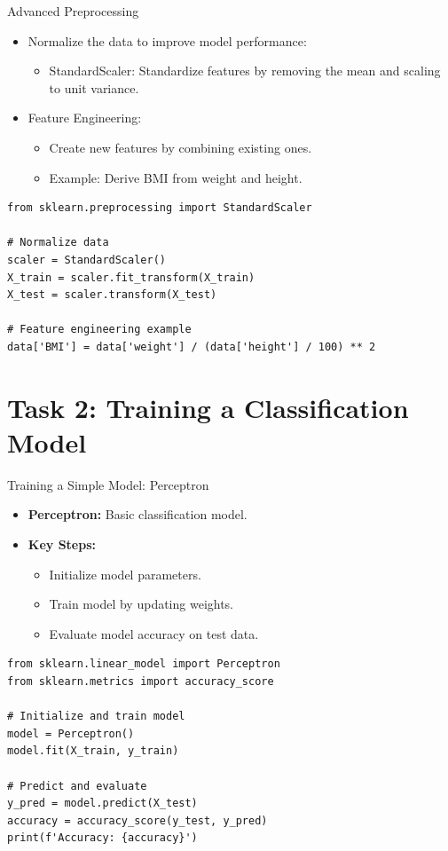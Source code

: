 \documentclass{beamer}
\begin{document}
\begin{frame}[fragile]{Advanced Preprocessing}
\begin{itemize}
    \item Normalize the data to improve model performance:
    \begin{itemize}
        \item StandardScaler: Standardize features by removing the mean and scaling to unit variance.
    \end{itemize}
    \item Feature Engineering:
    \begin{itemize}
        \item Create new features by combining existing ones.
        \item Example: Derive BMI from weight and height.
    \end{itemize}
\end{itemize}
\begin{lstlisting}
from sklearn.preprocessing import StandardScaler

# Normalize data
scaler = StandardScaler()
X_train = scaler.fit_transform(X_train)
X_test = scaler.transform(X_test)

# Feature engineering example
data['BMI'] = data['weight'] / (data['height'] / 100) ** 2
\end{lstlisting}
\end{frame}

\section{Task 2: Training a Classification Model}

\begin{frame}[fragile]{Training a Simple Model: Perceptron}
\begin{itemize}
    \item \textbf{Perceptron:} Basic classification model.
    \item \textbf{Key Steps:}
    \begin{itemize}
        \item Initialize model parameters.
        \item Train model by updating weights.
        \item Evaluate model accuracy on test data.
    \end{itemize}
\end{itemize}
\begin{lstlisting}
from sklearn.linear_model import Perceptron
from sklearn.metrics import accuracy_score

# Initialize and train model
model = Perceptron()
model.fit(X_train, y_train)

# Predict and evaluate
y_pred = model.predict(X_test)
accuracy = accuracy_score(y_test, y_pred)
print(f'Accuracy: {accuracy}')
\end{lstlisting}
\end{frame}
\end{document}
